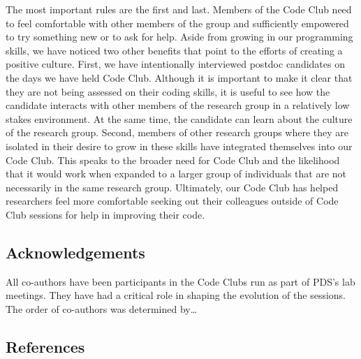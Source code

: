 \documentclass[
  11pt,
]{article}
\begin{document}
The most important rules are the first and last. Members of the Code
Club need to feel comfortable with other members of the group and
sufficiently empowered to try something new or to ask for help. Aside
from growing in our programming skills, we have noticed two other
benefits that point to the efforts of creating a positive culture.
First, we have intentionally interviewed postdoc candidates on the days
we have held Code Club. Although it is important to make it clear that
they are not being assessed on their coding skills, it is useful to see
how the candidate interacts with other members of the research group in
a relatively low stakes environment. At the same time, the candidate can
learn about the culture of the research group. Second, members of other
research groups where they are isolated in their desire to grow in these
skills have integrated themselves into our Code Club. This speaks to the
broader need for Code Club and the likelihood that it would work when
expanded to a larger group of individuals that are not necessarily in
the same research group. Ultimately, our Code Club has helped
researchers feel more comfortable seeking out their colleagues outside
of Code Club sessions for help in improving their code.

\hypertarget{acknowledgements}{%
\subsection{Acknowledgements}\label{acknowledgements}}

All co-authors have been participants in the Code Clubs run as part of
PDS's lab meetings. They have had a critical role in shaping the
evolution of the sessions. The order of co-authors was determined
by\ldots{}

\newpage

\hypertarget{references}{%
\subsection{References}\label{references}}
\end{document}

